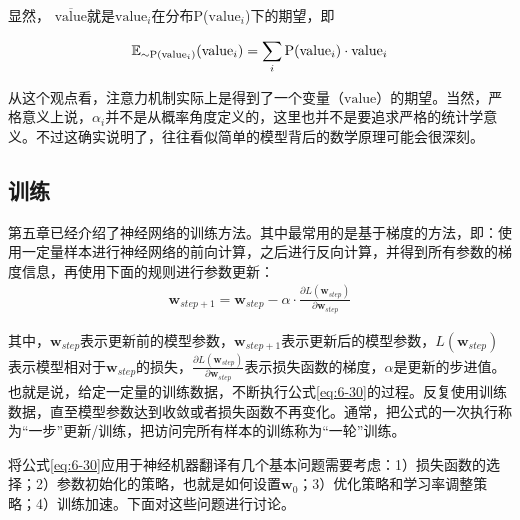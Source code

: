 \noindent 显然， $\overline{\mathrm{value}}$就是$\mathrm{value}_i$在分布P($\mathrm{value}_i$)下的期望，即

\begin{equation}
\mathbb{E}_{\sim \\ \textrm{P}( {\mathrm{\mathrm{value}}}_i )} ({\mathrm{value}}_i) = \sum_i \textrm{P}({\mathrm{value}}_i) \cdot {\mathrm{value}}_i
\label{eq:6-29}
\end{equation}

从这个观点看，注意力机制实际上是得到了一个变量（$\mathrm{value}$）的期望。当然，严格意义上说，$\alpha_i$并不是从概率角度定义的，这里也并不是要追求严格的统计学意义。不过这确实说明了，往往看似简单的模型背后的数学原理可能会很深刻。


\subsection{训练}

\parinterval 第五章已经介绍了神经网络的训练方法。其中最常用的是基于梯度的方法，即：使用一定量样本进行神经网络的前向计算，之后进行反向计算，并得到所有参数的梯度信息，再使用下面的规则进行参数更新：
\begin{eqnarray}
\mathbf{w}_{step+1} = \mathbf{w}_{step} - \alpha \cdot \frac{\partial L(\mathbf{w}_{step})} {\partial \mathbf{w}_{step} }
\label{eq:6-30}
\end{eqnarray}

\noindent 其中，$\mathbf{w}_{step}$表示更新前的模型参数，$\mathbf{w}_{step+1}$表示更新后的模型参数，$L(\mathbf{w}_{step})$表示模型相对于$\mathbf{w}_{step}$的损失，$\frac{\partial L(\mathbf{w}_{step})} {\partial \mathbf{w}_{step} }$表示损失函数的梯度，$\alpha$是更新的步进值。也就是说，给定一定量的训练数据，不断执行公式\ref{eq:6-30}的过程。反复使用训练数据，直至模型参数达到收敛或者损失函数不再变化。通常，把公式的一次执行称为``一步''更新/训练，把访问完所有样本的训练称为``一轮''训练。

\parinterval 将公式\ref{eq:6-30}应用于神经机器翻译有几个基本问题需要考虑：1）损失函数的选择；2）参数初始化的策略，也就是如何设置$\mathbf{w}_0$；3）优化策略和学习率调整策略；4）训练加速。下面对这些问题进行讨论。


